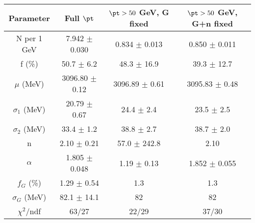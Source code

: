 \begin{tabular}{c||c|c|c}
Parameter & Full $\pt$ & $\pt>50$ GeV, G fixed & $\pt>50$ GeV, G+n fixed \\
\hline
N per 1 GeV & 7.942 $\pm$ 0.030 & 0.834 $\pm$ 0.013 & 0.850 $\pm$ 0.011\\
f (\%) & 50.7 $\pm$ 6.2 & 48.3 $\pm$ 16.9 & 39.3 $\pm$ 12.7\\
$\mu$ (MeV) & 3096.80 $\pm$ 0.12 & 3096.89 $\pm$ 0.61 & 3095.83 $\pm$ 0.48\\
$\sigma_1$ (MeV) & 20.79 $\pm$ 0.67 & 24.4 $\pm$ 2.4 & 23.5 $\pm$ 2.5\\
$\sigma_2$ (MeV) & 33.4 $\pm$ 1.2 & 38.8 $\pm$ 2.7 & 38.7 $\pm$ 2.0\\
n & 2.10 $\pm$ 0.21 & 57.0 $\pm$ 242.8 & 2.10\\
$\alpha$ & 1.805 $\pm$ 0.048 & 1.19 $\pm$ 0.13 & 1.852 $\pm$ 0.055\\
$f_G$ (\%) & 1.29 $\pm$ 0.54 & 1.3 & 1.3\\
$\sigma_G$ (MeV) & 82.1 $\pm$ 14.1 & 82 & 82\\
\hline
$\chi^2$/ndf & 63/27 & 22/29 & 37/30\\
\end{tabular}
